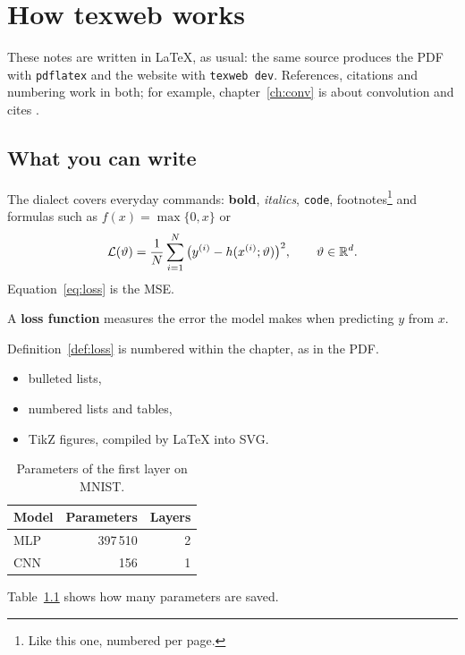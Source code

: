 \chapter{How texweb works}\label{ch:intro}
These notes are written in \LaTeX{}, as usual: the same source produces the PDF with \texttt{pdflatex} and the website with \texttt{texweb dev}. References, citations and numbering work in both; for example, chapter~\ref{ch:conv} is about convolution and cites \cite{Goodfellow-et-al-2016}.

\section{What you can write}
The dialect covers everyday commands: \textbf{bold}, \emph{italics}, \texttt{code}, footnotes\footnote{Like this one, numbered per page.} and formulas such as $f(x) = \max\{0, x\}$ or
\begin{equation}\label{eq:loss}
  \mathcal{L}(\vartheta) = \frac{1}{N}\sum_{i=1}^{N} \big(y^{(i)} - h(x^{(i)}; \vartheta)\big)^2, \qquad \vartheta \in \mathbb{R}^d.
\end{equation}
Equation~\eqref{eq:loss} is the MSE.

\begin{definition}\label{def:loss}
A \textbf{loss function} measures the error the model makes when predicting $y$ from $x$.
\end{definition}

Definition~\ref{def:loss} is numbered within the chapter, as in the PDF.

\begin{itemize}
  \item bulleted lists,
  \item numbered lists and tables,
  \item TikZ figures, compiled by \LaTeX{} into SVG.
\end{itemize}

\begin{table}[htbp]
\centering
\begin{tabular}{@{}lrr@{}}
\toprule
Model & Parameters & Layers \\
\midrule
MLP & 397\,510 & 2 \\
CNN & 156 & 1 \\
\bottomrule
\end{tabular}
\caption{Parameters of the first layer on MNIST.}
\label{tab:param}
\end{table}

Table~\ref{tab:param} shows how many parameters are saved.
